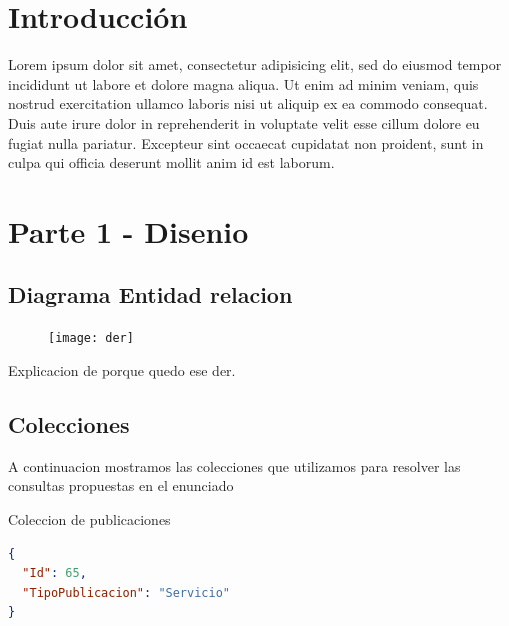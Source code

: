 \documentclass[a4paper, 10pt, twoside]{article}
\begin{document}
\newpage




\section{Introducción}

Lorem ipsum dolor sit amet, consectetur adipisicing elit, sed do eiusmod
tempor incididunt ut labore et dolore magna aliqua. Ut enim ad minim veniam,
quis nostrud exercitation ullamco laboris nisi ut aliquip ex ea commodo
consequat. Duis aute irure dolor in reprehenderit in voluptate velit esse
cillum dolore eu fugiat nulla pariatur. Excepteur sint occaecat cupidatat non
proident, sunt in culpa qui officia deserunt mollit anim id est laborum.

\section{Parte 1 - Disenio}

\subsection{Diagrama Entidad relacion}

\begin{figure}[h]
\texttt{[image: der]}
\end{figure}

Explicacion de porque quedo ese der.

\newpage
\subsection{Colecciones}

A continuacion mostramos las colecciones que utilizamos para resolver las consultas propuestas en el enunciado

Coleccion de publicaciones

\begin{lstlisting}[language=json,firstnumber=1]
{
  "Id": 65,
  "TipoPublicacion": "Servicio"
}
\end{lstlisting}
\end{document}
